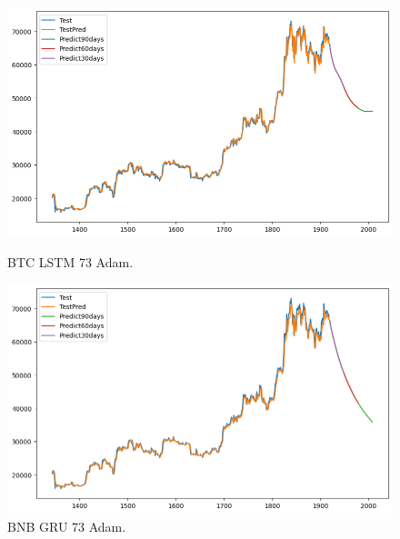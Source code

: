 \documentclass{ieeeojies}
\begin{document}
\begin{figure}[H]
  \centering
  \begin{minipage}{0.48\linewidth}
    \centering
    \includegraphics[width=1\linewidth]{image/BTC_LSTM_73_Adam.png}
    \caption{BTC LSTM 73 Adam.}
  \end{minipage}  
\hfill
  \begin{minipage}{0.48\linewidth}
    \centering
    \includegraphics[width=1\linewidth]{image/BTC_GRU_73_Adam.png}
    \caption{BNB GRU 73 Adam.}
  \end{minipage}
\end{figure}
\end{document}
